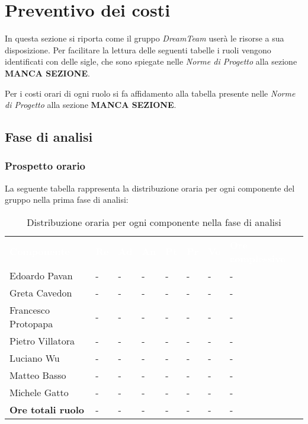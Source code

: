 \section{Preventivo dei costi}
In questa sezione si riporta come il gruppo \textit{DreamTeam} userà le risorse a sua disposizione.  Per facilitare la lettura delle seguenti tabelle i ruoli vengono identificati con delle sigle,  che sono spiegate nelle \textit{Norme di Progetto} alla sezione \textbf{MANCA SEZIONE}.

Per i costi orari di ogni ruolo si fa affidamento alla tabella presente nelle \textit{Norme di Progetto} alla sezione \textbf{MANCA SEZIONE}.

\subsection{Fase di analisi}
\subsubsection{Prospetto orario}
La seguente tabella rappresenta la distribuzione oraria per ogni componente del gruppo nella prima fase di analisi:
\begin{table}[!htbp]
\begin{center}
\renewcommand{\arraystretch}{1.25}
\begin{tabular}{ m{}<{\centering}  m{}<{\centering} m{}<{\centering} m{}<{\centering}  m{}<{\centering}  m{}<{\centering}  m{}<{\centering}  m{}<{\centering}   }
	\rowcolor{darkblue}
	\textcolor{white}{\textbf{Componente}} &\textcolor{white}{\textbf{Re}}&\textcolor{white}{\textbf{Ad}}&\textcolor{white}{\textbf{An}}&\textcolor{white}{\textbf{Pt}}&\textcolor{white}{\textbf{Pr}}&\textcolor{white}{\textbf{Ve}}&\textcolor{white}{\textbf{Ore complessive}}\\ 

	Edoardo Pavan & - & - & - & - & - & - & -\\	

	Greta Cavedon & - & - & - & - & - & - & -\\
	
	Francesco Protopapa & - & - & - & - & - & - & -\\
	
	Pietro Villatora & - & - & - & - & - & - & -\\
	
	Luciano Wu & - & - & - & - & - & - & -\\
	
	Matteo Basso & - & - & - & - & - & - & -\\
	
	Michele Gatto & - & - & - & - & - & - & -\\
	
	\textbf{Ore totali ruolo} & - & - & - & - & - & - & -\\

\end{tabular}
\caption{Distribuzione oraria per ogni componente nella fase di analisi}
\end{center}
\end{table}

